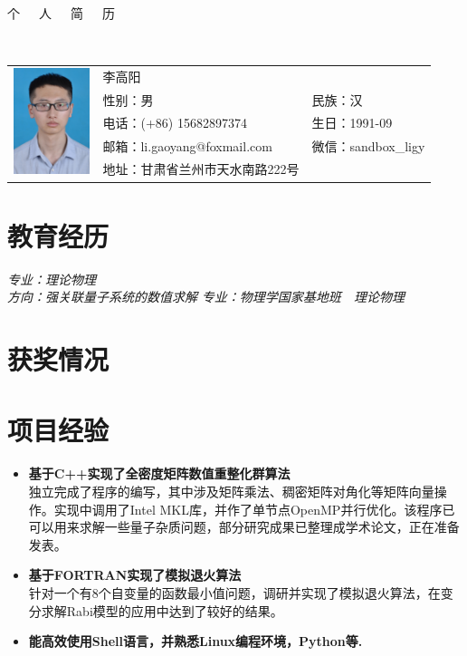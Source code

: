\documentclass{resume}
\begin{document}

\begin{center}
\Huge{个~~~人~~~简~~~历}
\end{center}
\\
\Large{
  \begin{tabu}{ c l l }
    &
   \scshape{李高阳} &  \\
    & 性别：男 & 民族：汉 \\
    & 电话：(+86) 15682897374 & 生日：1991-09 \\
    & 邮箱：li.gaoyang@foxmail.com & 微信：sandbox\_ligy\\
    & 地址：甘肃省兰州市天水南路222号 \hspace{40} & %
  \end{tabu}
}

\section{教育经历}
\textit{专业：理论物理}\\
\textit{方向：强关联量子系统的数值求解}
\textit{专业：物理学国家基地班\ \ 理论物理}

\section{获奖情况}

\section{项目经验}
\begin{itemize}%
\item \textbf{基于C++实现了全密度矩阵数值重整化群算法}\\
独立完成了程序的编写，其中涉及矩阵乘法、稠密矩阵对角化等矩阵向量操作。实现中调用了Intel MKL库，并作了单节点OpenMP并行优化。该程序已可以用来求解一些量子杂质问题，部分研究成果已整理成学术论文，正在准备发表。
\item \textbf{基于FORTRAN实现了模拟退火算法}\\
针对一个有8个自变量的函数最小值问题，调研并实现了模拟退火算法，在变分求解Rabi模型的应用中达到了较好的结果。
\item \textbf{能高效使用Shell语言，并熟悉Linux编程环境，Python等.}
\end{itemize}
\end{document}
